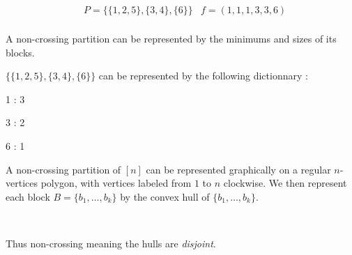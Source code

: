\begin{example}[$n = 6$]
    \begin{align*}
        &P = \{\{1, 2, 5\}, \{3, 4\}, \{6\}\}
        &f = (1, 1, 1, 3, 3, 6)\\
    \end{align*}
\end{example}

\begin{cor}
    A non-crossing partition can be represented by the minimums
    and sizes of its blocks.
\end{cor}

\begin{example}
    $\{\{1, 2, 5\}, \{3, 4\}, \{6\}\}$ can be represented by
    the following dictionnary :\\
    \begin{itemize*}
        \item 1 : 3\\
        \item 3 : 2\\
        \item 6 : 1\\
    \end{itemize*}
\end{example}

A non-crossing partition of $[n]$ can be represented graphically
on a regular $n$-vertices polygon, with vertices labeled from $1$
to $n$ clockwise. We then represent each block $B = \{b_1, \ldots, b_k\}$
by the convex hull of $\{b_1, \ldots, b_k\}$.\\

\begin{example}[$P = \{\{1, 2, 5\}, \{3, 4\}, \{6\}\}$]
    ~\\
    \begin{center}
    \end{center}
    Thus non-crossing meaning the hulls are
    \emph{disjoint}.\\
\end{example}

